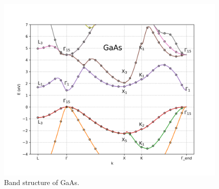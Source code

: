 \documentclass[twocolumn]{article}[h]
\begin{document}
\begin{figure}[htb]
    \centering
    \includegraphics[width=\linewidth]{GaAs.png}
    \vspace{-1cm}
    \caption{Band structure of GaAs.}
    \label{fig:GaAs}
\end{figure}
\end{document}
